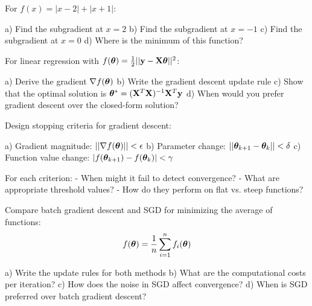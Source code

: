 \documentclass{article}
\newcounter{exercise}
\begin{document}
\begin{tcolorbox}[colback=gray!5!white,colframe=gray!75!black,title=Problem \stepcounter{exercise}: Subgradient Calculation]

For $f(x) = |x - 2| + |x + 1|$:

a) Find the subgradient at $x = 2$
b) Find the subgradient at $x = -1$  
c) Find the subgradient at $x = 0$
d) Where is the minimum of this function?
\end{tcolorbox}

\begin{tcolorbox}[colback=gray!5!white,colframe=gray!75!black,title=Problem \stepcounter{exercise}: Linear Regression Optimization]

For linear regression with $f(\boldsymbol{\theta}) = \frac{1}{2}||\mathbf{y} - \mathbf{X}\boldsymbol{\theta}||^2$:

a) Derive the gradient $\nabla f(\boldsymbol{\theta})$
b) Write the gradient descent update rule
c) Show that the optimal solution is $\boldsymbol{\theta}^* = (\mathbf{X}^T\mathbf{X})^{-1}\mathbf{X}^T\mathbf{y}$
d) When would you prefer gradient descent over the closed-form solution?
\end{tcolorbox}

\begin{tcolorbox}[colback=gray!5!white,colframe=gray!75!black,title=Problem \stepcounter{exercise}: Convergence Criteria]

Design stopping criteria for gradient descent:

a) Gradient magnitude: $||\nabla f(\boldsymbol{\theta})|| < \epsilon$
b) Parameter change: $||\boldsymbol{\theta}_{k+1} - \boldsymbol{\theta}_k|| < \delta$
c) Function value change: $|f(\boldsymbol{\theta}_{k+1}) - f(\boldsymbol{\theta}_k)| < \gamma$

For each criterion:
- When might it fail to detect convergence?
- What are appropriate threshold values?
- How do they perform on flat vs. steep functions?
\end{tcolorbox}

\begin{tcolorbox}[colback=gray!5!white,colframe=gray!75!black,title=Problem \stepcounter{exercise}: Stochastic Gradient Descent]

Compare batch gradient descent and SGD for minimizing the average of functions:
$$f(\boldsymbol{\theta}) = \frac{1}{n}\sum_{i=1}^n f_i(\boldsymbol{\theta})$$

a) Write the update rules for both methods
b) What are the computational costs per iteration?
c) How does the noise in SGD affect convergence?
d) When is SGD preferred over batch gradient descent?
\end{tcolorbox}
\end{document}
